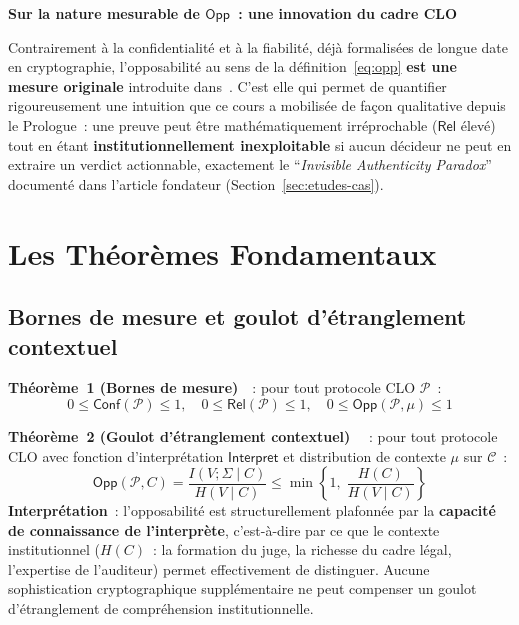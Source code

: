 \begin{boxalert}
\textbf{Sur la nature mesurable de $\mathsf{Opp}$~: une innovation
du cadre CLO}

Contrairement à la confidentialité et à la fiabilité, déjà
formalisées de longue date en cryptographie, l'opposabilité au sens
de la définition~\eqref{eq:opp} \textbf{est une mesure originale}
introduite dans~\cite{minka2026clo}. C'est elle qui permet de
quantifier rigoureusement une intuition que ce cours a mobilisée
de façon qualitative depuis le Prologue~: une preuve peut être
mathématiquement irréprochable ($\mathsf{Rel}$ élevé) tout en étant
\textbf{institutionnellement inexploitable} si aucun décideur ne
peut en extraire un verdict actionnable, exactement le
``\textit{Invisible Authenticity Paradox}'' documenté dans
l'article fondateur (Section~\ref{sec:etudes-cas}).
\end{boxalert}

\section{Les Théorèmes Fondamentaux}
\label{sec:theoremes}

\subsection{Bornes de mesure et goulot d'étranglement contextuel}

\begin{boxjuris}
\textbf{Théorème~1 (Bornes de mesure)}~\cite{minka2026clo}~: pour
tout protocole CLO $\mathcal{P}$~:
\begin{equation}
0 \leq \mathsf{Conf}(\mathcal{P}) \leq 1, \quad
0 \leq \mathsf{Rel}(\mathcal{P}) \leq 1, \quad
0 \leq \mathsf{Opp}(\mathcal{P}, \mu) \leq 1
\label{thm:bounds}
\end{equation}
\end{boxjuris}

\begin{boxjuris}
\textbf{Théorème~2 (Goulot d'étranglement contextuel)}~%
\cite{minka2026clo}~: pour tout protocole CLO avec fonction
d'interprétation $\mathsf{Interpret}$ et distribution de contexte
$\mu$ sur $\mathcal{C}$~:
\begin{equation}
\mathsf{Opp}(\mathcal{P}, C) = \frac{I(V;\Sigma\mid C)}{H(V\mid C)}
\leq \min\left\{1,\; \frac{H(C)}{H(V \mid C)}\right\}
\label{thm:bottleneck}
\end{equation}
\textbf{Interprétation}~: l'opposabilité est structurellement
plafonnée par la \textbf{capacité de connaissance de
l'interprète}, c'est-à-dire par ce que le contexte institutionnel
($H(C)$~: la formation du juge, la richesse du cadre légal,
l'expertise de l'auditeur) permet effectivement de distinguer.
Aucune sophistication cryptographique supplémentaire ne peut
compenser un goulot d'étranglement de compréhension institutionnelle.
\end{boxjuris}

